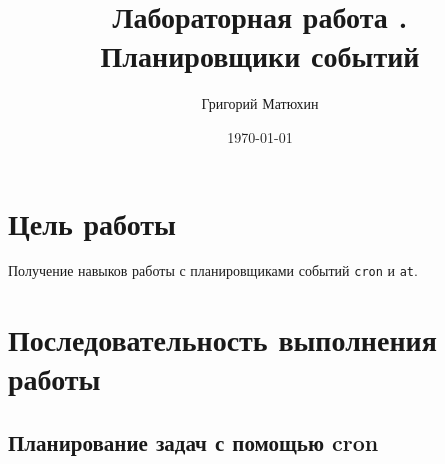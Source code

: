 \documentclass[12pt]{article}
\author{Григорий Матюхин}
\date{\today}
\title{Лабораторная работа \textnumero8.\\Планировщики событий}
\begin{document}
\maketitle
\newpage
\tableofcontents
\newpage
\section{Цель работы}
Получение навыков работы с планировщиками событий \texttt{cron} и \texttt{at}.

\section{Последовательность выполнения работы}

\subsection{Планирование задач с помощью cron}
\end{document}
